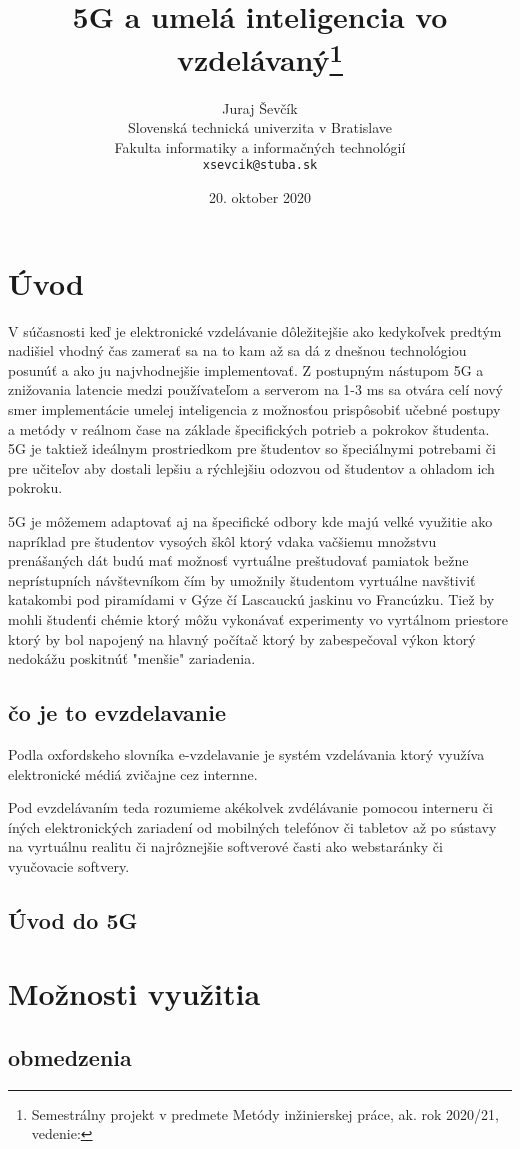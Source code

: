 \documentclass[12pt,sloak,a4paper]{article}
\title{5G a umelá inteligencia vo vzdelávaný\thanks{Semestrálny projekt v predmete Metódy inžinierskej práce, ak. rok 2020/21, vedenie:}}
\author{Juraj Ševčík\\[2pt]
	{\small Slovenská technická univerzita v Bratislave}\\
	{\small Fakulta informatiky a informačných technológií}\\
	{\small \texttt{xsevcik@stuba.sk}}
}
\date{\small 20. oktober 2020}
\begin{document}
\maketitle

\begin{abstract}


\end{abstract}
\newpage
\section{Úvod}
V súčasnosti  keď je elektronické vzdelávanie dôležitejšie ako kedykoľvek predtým nadišiel vhodný čas zamerať sa na to kam až sa dá z dnešnou technológiou posunúť a ako ju najvhodnejšie implementovať. Z postupným nástupom 5G a znižovania latencie medzi používateľom a serverom na 1-3 ms sa otvára celí nový smer implementácie umelej inteligencia z možnosťou prispôsobiť učebné postupy a metódy v reálnom čase na základe špecifických potrieb a pokrokov študenta. 5G je taktiež ideálnym prostriedkom pre študentov so špeciálnymi potrebami či pre učiteľov aby dostali lepšiu a rýchlejšiu odozvou od študentov a ohladom ich pokroku. 

5G je môžemem adaptovať aj na špecifické odbory kde majú velké využitie ako napríklad pre študentov vysoých škôl ktorý vdaka vačšiemu množstvu prenášaných dát budú mať možnosť vyrtuálne preštudovať pamiatok bežne neprístupních návštevníkom čím by umožnily študentom vyrtuálne navštiviť katakombi pod piramídami v Gýze čí Lascauckú jaskinu vo Francúzku. Tiež by mohli študenťi chémie ktorý môžu vykonávať experimenty vo vyrtálnom priestore ktorý by bol napojený na hlavný počítač ktorý by zabespečoval výkon ktorý nedokážu poskitnúť "menšie" zariadenia.



\subsection{čo je to evzdelavanie}
Podla oxfordskeho slovníka e-vzdelavanie je systém vzdelávania ktorý využíva elektronické médiá zvičajne cez internne. 

Pod evzdelávaním teda rozumieme akékolvek zvdélávanie pomocou interneru či íných elektronických zariadení od mobilných telefónov či tabletov až po sústavy na vyrtuálnu realitu či najrôznejšie softverové časti ako webstaránky či vyučovacie softvery. 
\subsection{Úvod do 5G}



\section{Možnosti využitia} 

\subsection{obmedzenia}
\end{document}
